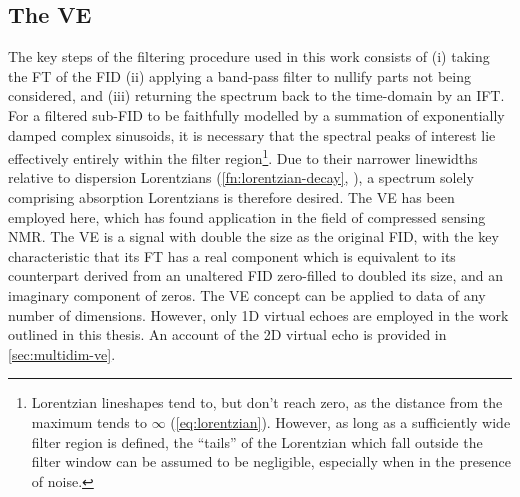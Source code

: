\subsection{The \acl{VE}}
\label{subsec:ve}
The key steps of the filtering procedure used in this work consists of (i)
taking the \ac{FT} of the \ac{FID} (ii) applying a band-pass filter
to nullify parts not being considered, and (iii) returning the spectrum back to
the time-domain by an \ac{IFT}.
For a filtered sub-\ac{FID} to be faithfully modelled by a
summation of exponentially damped complex sinusoids, it is necessary that the
spectral peaks of interest lie effectively entirely within the filter
region\footnote{
    Lorentzian lineshapes tend to, but don't reach zero, as the distance from
    the maximum tends to $\infty$ (\cref{eq:lorentzian}). However, as long as a
    sufficiently wide filter region is defined, the ``tails'' of the Lorentzian
    which fall outside the filter window can be assumed to be negligible,
    especially when in the presence of noise.
}.
Due to their narrower linewidths relative to dispersion Lorentzians
(\cref{fn:lorentzian-decay}, ), a spectrum solely
comprising absorption Lorentzians is therefore desired.
The \ac{VE} has been employed here, which has found application in the field of
compressed sensing NMR\cite{Mayzel2014,Golowicz2020,Luo2020}. The \ac{VE} is a
signal with double the size as the original \ac{FID}, with the key
characteristic that its \ac{FT} has a real component which is equivalent to its
counterpart derived from an unaltered \ac{FID} zero-filled to doubled its size,
and an imaginary component of zeros. The \ac{VE} concept can be applied
to data of any number of dimensions. However, only \ac{1D} virtual echoes are
employed in the work outlined in this thesis. An account of the \ac{2D} virtual
echo is provided in \cref{sec:multidim-ve}.

